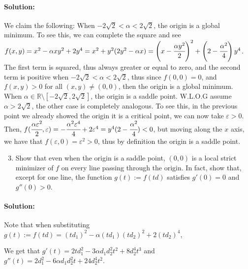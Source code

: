 \documentclass[10pt]{article}
\begin{document}
\paragraph{Solution:}

We claim the following: When $- 2 \sqrt{2} < \alpha < 2 \sqrt{2}$, the origin is a global minimum. To see this, we can complete the square
and see $f(x,y) = x^2 - \alpha xy^2 + 2 y^4 = x^2 + y^2(2y^2-\alpha x) = \left(x-\cfrac{\alpha y^2}{2}\right)^2 + \left(2 - \cfrac{\alpha^2}{4}\right)y^4$.\\

The first term is squared, thus always greater or equal to zero, and the second term is positive when $- 2 \sqrt{2} < \alpha < 2 \sqrt{2}$, thus since $f(0,0) = 0$, and $f(x,y) > 0$ for all $(x,y) \neq (0,0)$, then the origin is a global minimum.\\

When $\alpha \in \mathbb{R} \setminus [- 2 \sqrt{2}, 2 \sqrt{2}]$, the origin is a saddle point. W.L.O.G assume $\alpha > 2 \sqrt{2}$, the other case is completely analogous. To see this, in the previous point
we already showed the origin it is a critical point, we can now take $\varepsilon>0$. Then, $f(\cfrac{\alpha \varepsilon^2}{2}, \varepsilon) = - \cfrac{\alpha^2 \varepsilon^4}{4} + 2 \varepsilon^4 = y^4(2 - \cfrac{\alpha^2}{4}) < 0$, but moving along the $x$ axis, we have that $f(\varepsilon,0) = \varepsilon^2 > 0$, thus by definition the origin is a saddle point.\\






\begin{enumerate}[label=(\alph*)]
    \setcounter{enumi}{2}
    \item Show that even when the origin is a saddle point, $(0,0)$ is a local strict minimizer of $f$ on every line passing through the origin. In fact, show that, except for one line, the function $g(t):=f(td)$ satisfies $g'(0) =0$ and $g''(0)>0$.
\end{enumerate}

\paragraph{Solution:}

Note that when substituting $g(t) := f(td) = (td_1)^2 - \alpha (td_1) (td_2)^2 + 2 (t d_2)^4$, 

We get that $g'(t) = 2t d_1^2 - 3 \alpha d_1 d_2^2 t^2 + 8 d_2^4 t^3$ and 
$g''(t) = 2 d_1^2 - 6 \alpha d_1 d_2^2 t + 24 d_2^4 t^2$.\\
\end{document}
